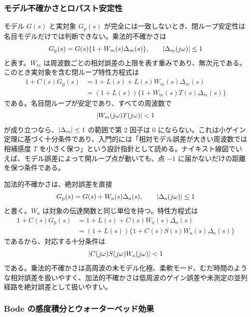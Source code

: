 \subsubsection{モデル不確かさとロバスト安定性}

モデル $G(s)$ と実対象 $G_{\mathrm{p}}(s)$ が完全には一致しないとき、閉ループ安定性は名目モデルだけでは判断できない。乗法的不確かさは
\begin{equation}
  G_{\mathrm{p}}(s)=G(s)\{1+W_m(s)\Delta_m(s)\},
  \qquad
  \left|\Delta_m(j\omega)\right|\le 1
\end{equation}
と表す。$W_m$ は周波数ごとの相対誤差の上限を表す重みであり、無次元である。このとき実対象を含む閉ループ特性方程式は
\begin{align}
  1+C(s)G_{\mathrm{p}}(s)
  &=1+L(s)+L(s)W_m(s)\Delta_m(s)\\
  &=(1+L(s))
    \{1+W_m(s)T(s)\Delta_m(s)\}
\end{align}
である。名目閉ループが安定であり、すべての周波数で
\begin{equation}
  \left|W_m(j\omega)T(j\omega)\right|<1
\end{equation}
が成り立つなら、$\left|\Delta_m\right|\le1$ の範囲で第 2 因子は 0 にならない。これは小ゲイン定理に基づく十分条件であり、入門的には「相対モデル誤差が大きい周波数では相補感度 $T$ を小さく保つ」という設計指針として読める。ナイキスト線図でいえば、モデル誤差によって開ループ点が動いても、点 $-1$ に届かないだけの距離を保つ条件である。

加法的不確かさは、絶対誤差を直接
\begin{equation}
  G_{\mathrm{p}}(s)=G(s)+W_a(s)\Delta_a(s),
  \qquad
  \left|\Delta_a(j\omega)\right|\le1
\end{equation}
と書く。$W_a$ は対象の伝達関数と同じ単位を持つ。特性方程式は
\begin{align}
  1+C(s)G_{\mathrm{p}}(s)
  &=1+L(s)+C(s)W_a(s)\Delta_a(s)\\
  &=(1+L(s))
    \{1+C(s)S(s)W_a(s)\Delta_a(s)\}
\end{align}
であるから、対応する十分条件は
\begin{equation}
  \left|C(j\omega)S(j\omega)W_a(j\omega)\right|<1
\end{equation}
である。乗法的不確かさは高周波の未モデル化極、柔軟モード、むだ時間のような相対誤差を扱いやすく、加法的不確かさは低周波のゲイン誤差や未測定の並列経路を絶対誤差として扱いやすい。

\subsubsection{Bode の感度積分とウォーターベッド効果}


